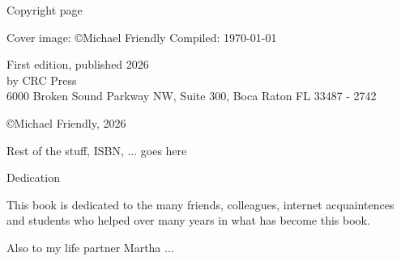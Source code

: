 
\thispagestyle{empty}

\Large{Copyright page}

Cover image: \copyright Michael Friendly
Compiled: \today

First edition, published 2026 \\
by CRC Press \\
6000 Broken Sound Parkway NW, Suite 300, Boca Raton FL 33487 - 2742

\copyright Michael Friendly, 2026

Rest of the stuff, ISBN, ... goes here

\cleardoublepage

\begin{center}
\Large{Dedication}

This book is dedicated to the many friends, colleagues, internet acquaintences and students who helped over many years in what has become this book.

Also to my life partner Martha ...
\end{center}

\setlength{\abovedisplayskip}{-5pt}
\setlength{\abovedisplayshortskip}{-5pt}



\hfuzz=5.002pt